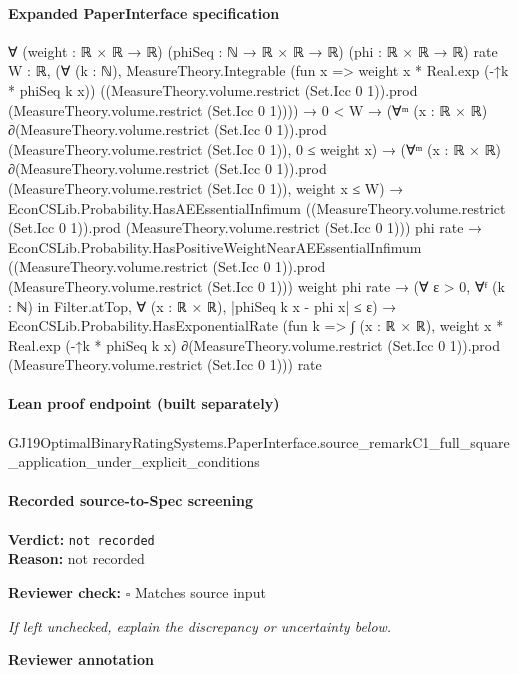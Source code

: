 \documentclass[10pt]{article}
\newcommand{\reviewerbox}{%
  \par\noindent\fbox{\parbox{0.96\linewidth}{\rule{0pt}{0.38in}}}\par
}
\newcommand{\reviewmatch}[1]{%
  \par\noindent\textbf{Reviewer check:} $\square$\; #1\par
  \noindent\emph{If left unchecked, explain the discrepancy or uncertainty below.}\par
}
\begin{document}
\paragraph{Expanded PaperInterface specification}
\begin{ReviewVerbatim}
∀ (weight : ℝ × ℝ → ℝ) (phiSeq : ℕ → ℝ × ℝ → ℝ) (phi : ℝ × ℝ → ℝ) {rate W : ℝ},
  (∀ (k : ℕ),
      MeasureTheory.Integrable (fun x => weight x * Real.exp (-↑k * phiSeq k x))
        ((MeasureTheory.volume.restrict (Set.Icc 0 1)).prod (MeasureTheory.volume.restrict (Set.Icc 0 1)))) →
    0 < W →
      (∀ᵐ (x : ℝ × ℝ) ∂(MeasureTheory.volume.restrict (Set.Icc 0 1)).prod (MeasureTheory.volume.restrict (Set.Icc 0 1)),
          0 ≤ weight x) →
        (∀ᵐ (x :
            ℝ × ℝ) ∂(MeasureTheory.volume.restrict (Set.Icc 0 1)).prod (MeasureTheory.volume.restrict (Set.Icc 0 1)),
            weight x ≤ W) →
          EconCSLib.Probability.HasAEEssentialInfimum
              ((MeasureTheory.volume.restrict (Set.Icc 0 1)).prod (MeasureTheory.volume.restrict (Set.Icc 0 1))) phi
              rate →
            EconCSLib.Probability.HasPositiveWeightNearAEEssentialInfimum
                ((MeasureTheory.volume.restrict (Set.Icc 0 1)).prod (MeasureTheory.volume.restrict (Set.Icc 0 1)))
                weight phi rate →
              (∀ ε > 0, ∀ᶠ (k : ℕ) in Filter.atTop, ∀ (x : ℝ × ℝ), |phiSeq k x - phi x| ≤ ε) →
                EconCSLib.Probability.HasExponentialRate
                  (fun k =>
                    ∫ (x : ℝ × ℝ),
                      weight x *
                        Real.exp
                          (-↑k *
                            phiSeq k
                              x) ∂(MeasureTheory.volume.restrict (Set.Icc 0 1)).prod
                        (MeasureTheory.volume.restrict (Set.Icc 0 1)))
                  rate
\end{ReviewVerbatim}

\paragraph{Lean proof endpoint (built separately)}\begin{ReviewVerbatim}
GJ19OptimalBinaryRatingSystems.PaperInterface.source_remarkC1_full_square_application_under_explicit_conditions
\end{ReviewVerbatim}

\paragraph{Recorded source-to-Spec screening}
\textbf{Verdict:} \texttt{not recorded}
\\
\textbf{Reason:} not recorded
\reviewmatch{Matches source input}
\noindent\textbf{Reviewer annotation}\par
\reviewerbox
\clearpage
\hypertarget{source-claim-7529d1dedcffdbe3}{}
\end{document}

